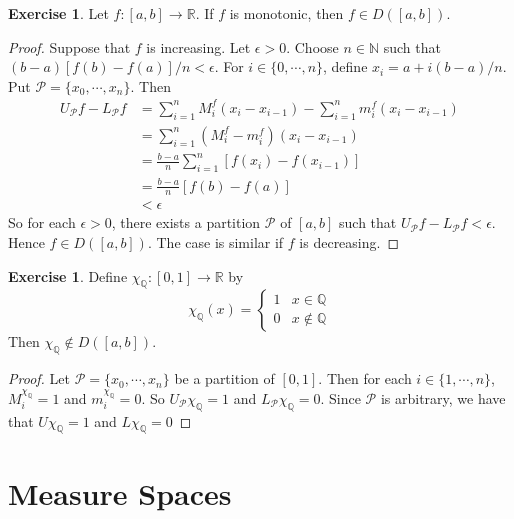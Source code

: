 \documentclass{book}
\theoremstyle{definition}
\newtheorem{ex}[definition]{Exercise}
\newcommand{\ep}{\epsilon}
\newcommand{\N}{\mathbb{N}}
\newcommand{\Q}{\mathbb{Q}}
\newcommand{\R}{\mathbb{R}}
\newcommand{\MP}{\mathcal{P}}
\newcommand{\lex}[1]{\label{ex:#1}}
\DeclareMathOperator*{\0}{\mbf{0}}
\DeclareMathOperator*{\1}{\mbf{1}}
\begin{document}
	\begin{ex} \lex{00000} 
		Let $f:[a,b] \rightarrow \R$. If $f$ is monotonic, then $f \in D([a,b])$.
	\end{ex}

	\begin{proof}
		Suppose that $f$ is increasing. Let $\ep >0$. Choose $n \in \N$ such that $(b-a)[f(b) - f(a)] /n < \ep $. For $i \in \{0, \cdots, n\}$, define $x_i = a + i(b-a)/n$. Put $\MP = \{x_0, \cdots, x_n\}$. Then 
		\begin{align*}
			U_\MP f - L_\MP f 
			&= \sum_{i=1}^n M^f_i(x_i - x_{i-1}) - \sum_{i=1}^n m^f_i(x_i - x_{i-1}) \\
			&= \sum_{i=1}^n (M^f_i - m^f_i)(x_i - x_{i-1}) \\
			&= \frac{b-a}{n} \sum_{i=1}^n [f(x_i) - f(x_{i-1})]  \\
			&= \frac{b-a}{n} [f(b) - f(a)] \\
			& < \ep
		\end{align*}
	So for each $\ep >0$, there exists a partition $\MP$ of $[a,b]$ such that $U_\MP f - L_\MP f < \ep$. Hence $f \in D([a,b])$. The case is similar if $f$ is decreasing. 
	\end{proof}

	\begin{ex} \lex{00000} 
		Define $\chi_{\Q}:[0,1] \rightarrow \R$ by $$\chi_{\Q}(x) = \begin{cases}
			1 & x \in \Q \\
			0 & x \not \in \Q
		\end{cases}$$
		Then $\chi_\Q \not \in D([a,b])$.
	\end{ex}

	\begin{proof}
		Let $\MP = \{x_0, \cdots, x_n\}$ be a partition of $[0,1]$. Then for each $i \in \{1, \cdots, n\}$, $M^{\chi_{\Q}}_i = 1$ and $m^{\chi_{\Q}}_i = 0$. So $U_\MP \chi_\Q = 1$ and $L_\MP \chi_\Q = 0$. Since $\MP$ is arbitrary, we have that $U \chi_\Q = 1$ and $L \chi_\Q = 0$
	\end{proof}

	
	
	
	
	
	
	
	
	
	
	
	
	
	
	\newpage
	
	\chapter{Measure Spaces}
	
\end{document}
